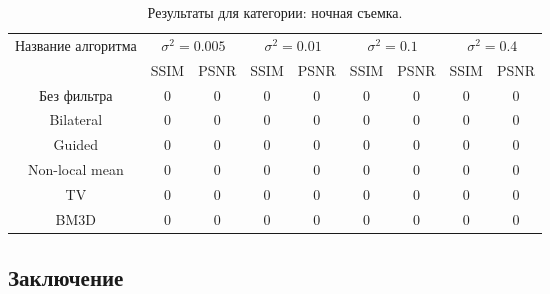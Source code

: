 \begin{table}[H]
	\caption{\label{tab:bolts} Результаты для категории: ночная съемка.}
	\begin{tabular}{|c|c|c|c|c|c|c|c|c|}
		\hline
	Название алгоритма & \multicolumn{2}{|c|}{$\sigma^2=0.005$}  & \multicolumn{2}{|c|}{$\sigma^2=0.01$}& \multicolumn{2}{|c|}{$\sigma^2=0.1$} & \multicolumn{2}{|c|}{$\sigma^2=0.4$} \\
		\cline{2-9}
		& SSIM  & PSNR & SSIM  & PSNR & SSIM  & PSNR & SSIM  & PSNR\\
		\hline
Без фильтра & 0 & 0& 0 & 0& 0 & 0 & 0 & 0 \\
\hline
		Bilateral & 0 & 0& 0 & 0& 0 & 0 & 0 & 0 \\
		\hline
		Guided & 0 & 0& 0 & 0& 0 & 0 & 0 & 0 \\
		\hline
		Non-local mean & 0 & 0& 0 & 0& 0 & 0 & 0 & 0 \\
		\hline
		TV & 0 & 0& 0 & 0& 0 & 0 & 0 & 0 \\
		\hline
		BM3D & 0 & 0& 0 & 0& 0 & 0 & 0 & 0 \\
		\hline	
	\end{tabular}
\end{table}


\subsection{Заключение}
